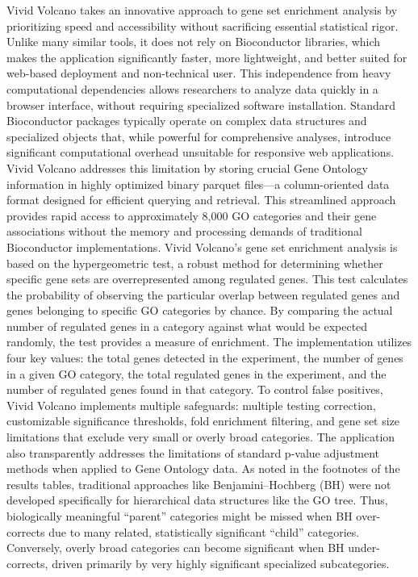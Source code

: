 \documentclass[
]{article}
\begin{document}
Vivid Volcano takes an innovative approach to gene set enrichment
analysis by prioritizing speed and accessibility without sacrificing
essential statistical rigor. Unlike many similar tools, it does not rely
on Bioconductor libraries, which makes the application significantly
faster, more lightweight, and better suited for web-based deployment and
non-technical user. This independence from heavy computational
dependencies allows researchers to analyze data quickly in a browser
interface, without requiring specialized software installation. Standard
Bioconductor packages typically operate on complex data structures and
specialized objects that, while powerful for comprehensive analyses,
introduce significant computational overhead unsuitable for responsive
web applications. Vivid Volcano addresses this limitation by storing
crucial Gene Ontology information in highly optimized binary parquet
files---a column-oriented data format designed for efficient querying
and retrieval. This streamlined approach provides rapid access to
approximately 8,000 GO categories and their gene associations without
the memory and processing demands of traditional Bioconductor
implementations. Vivid Volcano's gene set enrichment analysis is based
on the hypergeometric test, a robust method for determining whether
specific gene sets are overrepresented among regulated genes. This test
calculates the probability of observing the particular overlap between
regulated genes and genes belonging to specific GO categories by chance.
By comparing the actual number of regulated genes in a category against
what would be expected randomly, the test provides a measure of
enrichment. The implementation utilizes four key values: the total genes
detected in the experiment, the number of genes in a given GO category,
the total regulated genes in the experiment, and the number of regulated
genes found in that category. To control false positives, Vivid Volcano
implements multiple safeguards: multiple testing correction,
customizable significance thresholds, fold enrichment filtering, and
gene set size limitations that exclude very small or overly broad
categories. The application also transparently addresses the limitations
of standard p-value adjustment methods when applied to Gene Ontology
data. As noted in the footnotes of the results tables, traditional
approaches like Benjamini--Hochberg (BH) were not developed specifically
for hierarchical data structures like the GO tree. Thus, biologically
meaningful ``parent'' categories might be missed when BH over-corrects
due to many related, statistically significant ``child'' categories.
Conversely, overly broad categories can become significant when BH
under-corrects, driven primarily by very highly significant specialized
subcategories.
\end{document}
